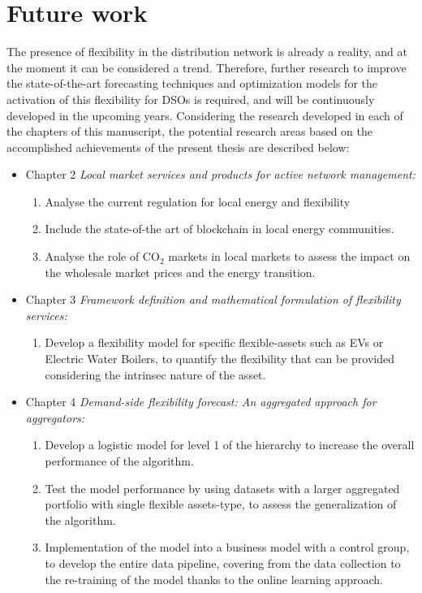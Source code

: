 \section{Future work}
The presence of flexibility in the distribution network is already a reality, and at the moment it can be considered a trend. Therefore, further research to improve the state-of-the-art forecasting techniques and optimization models for the activation of this flexibility for DSOs is required, and will be continuously developed in the upcoming years. 
Considering the research developed in each of the chapters of this manuscript, the potential research areas based on the accomplished achievements of the present thesis are described below: 

\begin{itemize}
\item Chapter 2 \textit{Local market services and products for active network management:} 
	\begin{enumerate}
		\item Analyse the current regulation for local energy and flexibility 
		\item Include the state-of-the art of blockchain in local energy communities. 
		\item Analyse the role of CO$_2$ markets in local markets to assess the impact on the wholesale market prices and the energy transition. 
	\end{enumerate}
\item Chapter 3 \textit{Framework definition and mathematical formulation of flexibility services:} 
	\begin{enumerate}
		\item Develop a flexibility model for specific flexible-assets such as EVs or Electric Water Boilers, to quantify the flexibility that can be provided considering the intrinsec nature of the asset. 
	\end{enumerate}
\item Chapter 4 \textit{Demand-side flexibility forecast: An aggregated approach for aggregators:} 
	\begin{enumerate}
		\item Develop a logistic model for level 1 of the hierarchy to increase the overall performance of the algorithm. 
		\item Test the model performance by using datasets with a larger aggregated portfolio with single flexible assets-type, to assess the generalization of the algorithm.
		\item Implementation of the model into a business model with a control group, to develop the entire data pipeline, covering from the data collection to the re-training of the model thanks to the online learning approach.  

\end{enumerate}
\end{itemize}
